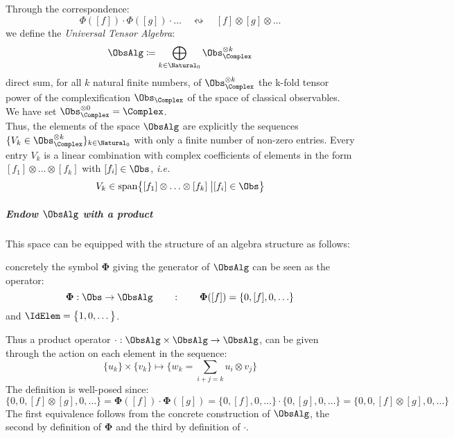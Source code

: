 \documentclass[Main]{subfiles}
\begin{document}
   				Through the correspondence:
   				\begin{displaymath}
   					\mathbb{\Phi}([f]) \cdot \mathbb{\Phi}([g]) \cdot \ldots \quad \leftrightsquigarrow \quad [f] \otimes [g] \otimes \ldots
   				\end{displaymath}
   				we define %
   				the \emph{Universal Tensor Algebra}:
   				\begin{displaymath}
   					\ObsAlg \coloneqq \bigoplus_{k \in \Natural_0} \Obs_\Complex^{\otimes k}
   				\end{displaymath}
   				direct sum, for all $k$ natural finite numbers, of $\Obs_\Complex^{\otimes k}$ the k-fold tensor power of the complexification $\Obs_\Complex$ of the space of classical observables.
   				We have set $\Obs_\Complex^{\otimes 0} = \Complex$.
				\\
				Thus, the elements of the space $\ObsAlg$ are explicitly the sequences $\{ V_k \in \Obs_\Complex^{\otimes k} \}_{k\in \Natural_0}$ with only a finite number of non-zero entries.
				Every entry $V_k$ is a linear combination with complex coefficients  of elements in the form $[f_1]\otimes\ldots \otimes [f_k]$ with $[f_i] \in \Obs$,
				\textit{i.e.} $$V_k \in \textrm{span}\big\{[f_1]\otimes\ldots \otimes [f_k] \; \big \vert [f_i] \in \Obs \big\}$$

			\subparagraph{Endow $\ObsAlg$ with a product }
				This space can be equipped with the structure of an algebra structure as follows:

				concretely the symbol $\mathbf{\Phi}$ giving the generator of $\ObsAlg$ can be seen as the operator:
						\begin{displaymath}
							\mathbf{\Phi}: \Obs \rightarrow \ObsAlg \qquad : \qquad \mathbf{\Phi}([f]) = \{ 0, [f], 0,\ldots\}
						\end{displaymath}
						and $\IdElem = \big\{ 1,0,\ldots \big\}$.

				Thus a product operator $ \cdot : \ObsAlg \times \ObsAlg \rightarrow \ObsAlg$, can be given through the action on each element in the sequence:
					\begin{displaymath}
						\{ u_k\} \times \{ v_k \} \mapsto \{ w_k = \sum_{i+j=k} u_i \otimes v_j \}
					\end{displaymath}
					The definition is well-posed since:
					\begin{displaymath}
						\big\{ 0,0, [f]\otimes [g],0, \ldots \big\} = \mathbf{\Phi}([f]) \cdot \mathbf{\Phi}([g]) =
						\{0,[f],0,\ldots\} \cdot \{ 0,[g],0,\ldots\} = \big\{0,0, [f]\otimes [g],0,\ldots\big\}
					\end{displaymath}
					The first equivalence follows from the concrete construction of $\ObsAlg$, the second by definition of $\mathbf{\Phi}$ and the third by definition of $\cdot$.
\end{document}
